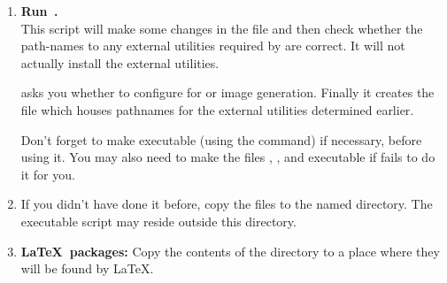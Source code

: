 \begin{enumerate}
%
%
\item
\textbf{Run \,.} \\
This \Perl{} script will make some changes in the  file
and then check whether the path-names to any external utilities
required by  are correct.
It will not actually install the external utilities.
\begin{changebar}
 asks you whether to configure for  or
 image generation.
Finally it creates the file  which houses pathnames for the
external utilities determined earlier.
\end{changebar}

Don't forget to make  executable
(using the  command) if necessary, before using it.
You may also need to make the files ,
,  and  executable
if  fails to do it for you.

%
\item If you didn't have done it before, copy the files to the named
 directory.
The executable script  may reside outside this directory.



\item
{}%
\textbf{\LaTeX\ packages:} Copy the contents of the 
directory to a place where they will be found by \LaTeX.
\end{enumerate}

